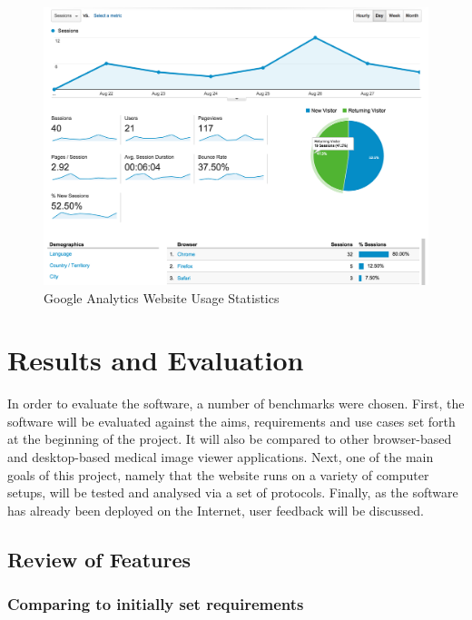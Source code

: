 \documentclass[a4paper,11pt,twoside]{article}
\begin{document}
\begin{figure}[ht!]
\centering
\includegraphics[width=160mm]{graphics/googleAnalytics_01.png}
\caption{Google Analytics Website Usage Statistics}
\label{fig:UIdesign1}
\end{figure}








\newpage


\section{Results and Evaluation}

In order to evaluate the software, a number of benchmarks were chosen. First, the software will be evaluated against the aims, requirements and use cases set forth at the beginning of the project. It will also be compared to other browser-based and desktop-based medical image viewer applications. Next, one of the main goals of this project, namely that the website runs on a variety of computer setups, will be tested and analysed via a set of protocols. Finally, as the software has already been deployed on the Internet, user feedback will be discussed.


\subsection{Review of Features}

\subsubsection{Comparing to initially set requirements}
\end{document}

